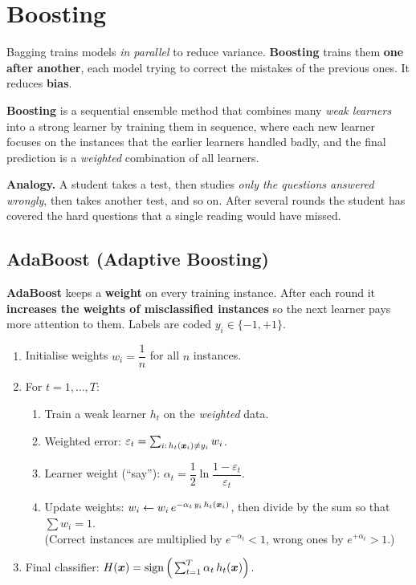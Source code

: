 \section{Boosting}

Bagging trains models \emph{in parallel} to reduce variance. \textbf{Boosting} trains them \textbf{one after another}, each model trying to correct the mistakes of the previous ones. It reduces \textbf{bias}.

\begin{definition}[: Boosting]
\textbf{Boosting} is a sequential ensemble method that combines many \emph{weak learners} into a strong learner by training them in sequence, where each new learner focuses on the instances that the earlier learners handled badly, and the final prediction is a \emph{weighted} combination of all learners.
\end{definition}

\begin{keyidea}
\textbf{Analogy.} A student takes a test, then studies \emph{only the questions answered wrongly}, then takes another test, and so on. After several rounds the student has covered the hard questions that a single reading would have missed.
\end{keyidea}

\subsection{AdaBoost (Adaptive Boosting)}

\textbf{AdaBoost} keeps a \textbf{weight} on every training instance. After each round it \textbf{increases the weights of misclassified instances} so the next learner pays more attention to them. Labels are coded $y_i\in\{-1,+1\}$.

\begin{definition}
\begin{enumerate}
  \item Initialise weights $w_i=\dfrac1n$ for all $n$ instances.
  \item For $t=1,\dots,T$:
  \begin{enumerate}[label=(\alph*)]
    \item Train a weak learner $h_t$ on the \emph{weighted} data.
    \item Weighted error: $\varepsilon_t=\sum_{i:\,h_t(\boldsymbol{x}_i)\neq y_i}w_i$.
    \item Learner weight (``say''): $\alpha_t=\dfrac12\ln\dfrac{1-\varepsilon_t}{\varepsilon_t}$.
    \item Update weights: $w_i\leftarrow w_i\,e^{-\alpha_t\,y_i\,h_t(\boldsymbol{x}_i)}$, then divide by the sum so that $\sum w_i=1$.\\
    (Correct instances are multiplied by $e^{-\alpha_t}<1$, wrong ones by $e^{+\alpha_t}>1$.)
  \end{enumerate}
  \item Final classifier: $H(\boldsymbol{x})=\operatorname{sign}\Big(\sum_{t=1}^{T}\alpha_t\,h_t(\boldsymbol{x})\Big)$.
\end{enumerate}
\end{definition}

